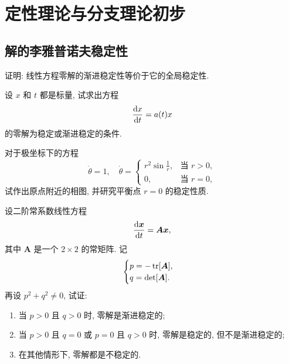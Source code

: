 \chapter{定性理论与分支理论初步}



\setcounter{section}{1}
\section{解的李雅普诺夫稳定性}



\begin{exercise}
  证明: 线性方程零解的渐进稳定性等价于它的全局稳定性.
\end{exercise}



\begin{exercise}
  设 $x$ 和 $t$ 都是标量, 试求出方程
  \[\frac{\mathop{}\!\mathrm{d} x}{\mathop{}\!\mathrm{d} t} = a(t)x\]
  的零解为稳定或渐进稳定的条件.
\end{exercise}



\begin{exercise}
  对于极坐标下的方程
  \[\dot{\theta} = 1,\quad \dot{\theta} = \begin{cases}
    r^2\sin\frac{1}{r}, & \text{当\ } r>0, \\
    0, & \text{当\ } r=0,
  \end{cases}\]
  试作出原点附近的相图, 并研究平衡点 $r=0$ 的稳定性质.
\end{exercise}



\begin{exercise}
  设二阶常系数线性方程
  \[\frac{\mathop{}\!\mathrm{d}\bm{x}}{\mathop{}\!\mathrm{d} t} = \bm{A}\bm{x},\]
  其中 $\bm{A}$ 是一个 $2\times 2$ 的常矩阵. 记
  \[\begin{cases}
    p = -\operatorname{tr}[\bm{A}], \\
    q = \det[\bm{A}].
  \end{cases}\]
  再设 $p^2+q^2\neq 0$, 试证:
  \begin{enumerate}[(1)]
    \item 当 $p>0$ 且 $q>0$ 时, 零解是渐进稳定的;
    \item 当 $p>0$ 且 $q=0$ 或 $p=0$ 且 $q>0$ 时, 零解是稳定的, 但不是渐进稳定的;
    \item 在其他情形下, 零解都是不稳定的.
  \end{enumerate}
\end{exercise}



